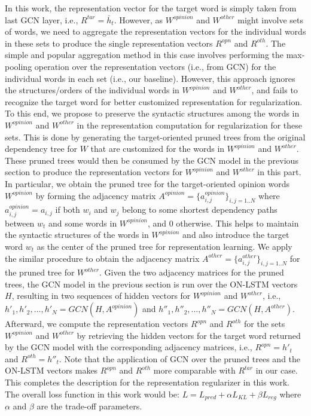 \documentclass[11pt,a4paper]{article}
\begin{document}
In this work, the representation vector for the target word is simply taken from last GCN layer, i.e., $R^{tar} = \bar{h}_t$. However, as $W^{opinion}$ and $W^{other}$ might involve sets of words, we need to aggregate the representation vectors for the individual words in these sets to produce the single representation vectors $R^{opn}$ and $R^{oth}$. The simple and popular aggregation method in this case involves performing the max-pooling operation over the representation vectors (i.e., from GCN) for the individual words in each set (i.e., our baseline). However, this approach ignores the structures/orders of the individual words in $W^{opinion}$ and $W^{other}$, and fails to recognize the target word for better customized representation for regularization. To this end, we propose to preserve the syntactic structures among the words in $W^{opinion}$ and $W^{other}$ in the representation computation for regularization for these sets. This is done by generating the target-oriented pruned trees from the original dependency tree for $W$ that are customized for the words in $W^{opinion}$ and $W^{other}$. These pruned trees would then be consumed by the GCN model in the previous section to produce the representation vectors for $W^{opinion}$ and $W^{other}$ in this part. In particular, we obtain the pruned tree for the target-oriented opinion words $W^{opinion}$ by forming the adjacency matrix $A^{opinion} = \{a^{opinion}_{i,j}\}_{i,j=1..N}$ where $a^{opinion}_{i,j} = a_{i,j}$ if both $w_i$ and $w_j$ belong to some shortest dependency paths between $w_t$ and some words in $W^{opinion}$, and 0 otherwise. This helps to maintain the syntactic structures of the words in $W^{opinion}$ and also introduce the target word $w_t$ as the center of the pruned tree for representation learning. We apply the similar procedure to obtain the adjacency matrix $A^{other} = \{a^{other}_{i,j}\}_{i,j=1..N}$ for the pruned tree for $W^{other}$. Given the two adjacency matrices for the pruned trees, the GCN model in the previous section is run over the ON-LSTM vectors $H$, resulting in two sequences of hidden vectors for $W^{opinion}$ and $W^{other}$, i.e., $h'_1,h'_2,\ldots,h'_N = GCN(H, A^{opinion})$ and $h''_1,h''_2,\ldots,h''_N = GCN(H, A^{other})$. Afterward, we compute the representation vectors $R^{opn}$ and $R^{oth}$ for the sets $W^{opinion}$ and $W^{other}$ by retrieving the hidden vectors for the target word returned by the GCN model with the corresponding adjacency matrices, i.e., $R^{opn} = h'_t$ and $R^{oth} = h''_t$. Note that the application of GCN over the pruned trees and the ON-LSTM vectors makes $R^{opn}$ and $R^{oth}$ more comparable with $R^{tar}$ in our case. This completes the description for the representation regularizer in this work. The overall loss function in this work would be: $L = L_{pred} + \alpha L_{KL} + \beta L_{reg}$ where $\alpha$ and $\beta$ are the trade-off parameters.
\end{document}
